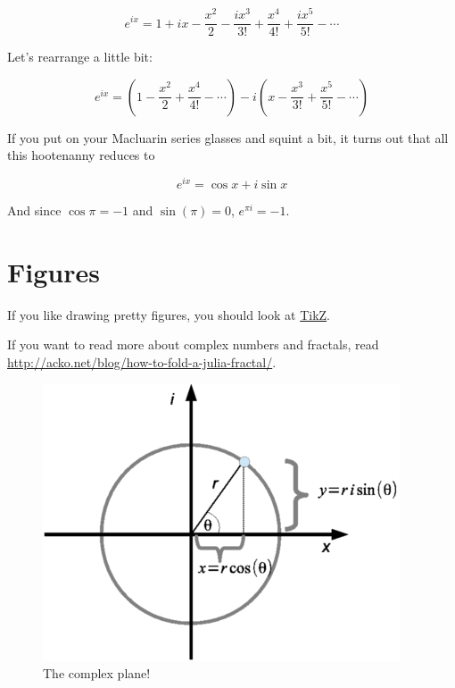 \documentclass{article}
\begin{document}
\begin{equation}
e^{ix} = 1 + ix - \frac{x^2}{2} - \frac{ix^3}{3!} + \frac{x^4}{4!} +
\frac{ix^5}{5!} - \cdots
\end{equation}

Let's rearrange a little bit:

\begin{equation}
e^{ix} = \left(1 - \frac{x^2}{2} + \frac{x^4}{4!} - \cdots\right) - 
i\left(x - \frac{x^3}{3!} + \frac{x^5}{5!} - \cdots\right)
\end{equation}

If you put on your Macluarin series glasses and squint a bit, it turns out
that all this hootenanny reduces to

\begin{equation}
e^{ix} = \cos{x} + i\sin{x}
\end{equation}

And since $\cos{\pi} = -1$ and $\sin(\pi) = 0$, $e^{\pi{i}} = -1$.

\section{Figures}
If you like drawing pretty figures, you should look at 
\href{http://www.texample.net/tikz/examples/all/}{TikZ}.

If you want to read more about complex numbers and fractals, read
\url{http://acko.net/blog/how-to-fold-a-julia-fractal/}.

\begin{figure}[h]
  \caption{The complex plane!}

  \includegraphics{complex.png}
\end{figure}
\end{document}
